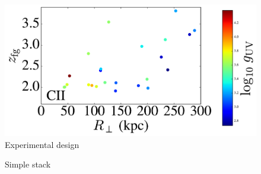 \documentclass[iop]{emulateapj}
\begin{document}
%
%





%

%
%



\clearpage

\begin{figure}
\includegraphics[width=5in]{Figures/fig_experiment.pdf}
\caption{Experimental design
}
\label{fig:exp}
\end{figure}

\begin{figure}
\caption{Simple stack
}
\label{fig:stack}
\end{figure}
\end{document}
